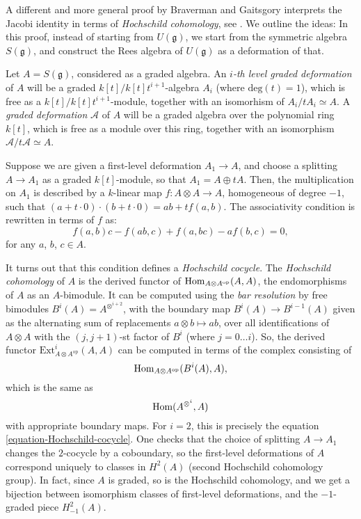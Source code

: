 \begin{remark}
 \label{remark-PBW-Hochschild}
A different and more general proof by Braverman and Gaitsgory interprets the Jacobi identity in terms of \emph{Hochschild cohomology}, see \cite{Braverman-Gaitsgory-PBW}. We outline the ideas: In this proof, instead of starting from $U(\mathfrak g)$, we start from the symmetric algebra $S(\mathfrak g)$, and construct the Rees algebra of $U(\mathfrak g)$ as a deformation of that. 

Let $A=S(\mathfrak g)$, considered as a graded algebra. An \emph{$i$-th level graded deformation} of $A$ will be a graded $k[t]/k[t]t^{i+1}$-algebra $A_i$ (where $\text{deg}(t)=1$), which is free as a $k[t]/k[t]t^{i+1}$-module, together with an isomorhism of $A_i/tA_i \simeq A$. A \emph{graded deformation} $\mathcal A$ of $A$ will be a graded algebra over the
polynomial ring $k[t]$, which is free as a module over this ring,
together with an isomorphism $\mathcal A/t\mathcal A\simeq A$.

Suppose we are given a first-level deformation $A_1 \to A $, and choose a splitting $A\to A_1$ as a graded $k[t]$-module, so that $A_1 = A \oplus t A$. Then, the multiplication on $A_1$ is described by a $k$-linear map $f: A\otimes A \to A$, homogeneous of degree $-1$, such that $(a+t \cdot 0)\cdot (b+t\cdot 0) = ab + t f(a,b)$. The associativity condition is rewritten in terms of $f$ as:
\begin{equation}
 \label{equation-Hochschild-cocycle}
f (a, b)c − f (ab, c) + f (a, bc) − af (b, c) = 0, 
\end{equation}
for any $a$, $b$, $c \in A$.

It turns out that this condition defines a \emph{Hochschild cocycle}. The \emph{Hochschild cohomology} of $A$ is the derived functor of $\mathop{\rm Hom}\nolimits_{A\otimes A^{\text{op}}} (A,A)$, the endomorphisms of $A$ as an $A$-bimodule. It can be computed using the \emph{bar resolution} by free bimodules $B^i (A) = A^{\otimes^{i+2}}$, with the boundary map $B^i (A) \to B^{i-1}(A)$ given as the alternating sum of replacements $a\otimes b \mapsto ab$, over all identifications of $A\otimes A$ with the $(j, j+1)$-st factor of $B^i$ (where $j=0\dots i$). So, the derived functor $\text{Ext}^i_{A\otimes A^{\text{op}}} (A,A)$ can be computed in terms of the complex consisting of 
$$ \mathop{\rm Hom}\nolimits_{A\otimes A^{\text{op}}} (B^i(A),A),$$
which is the same as 
$$\mathop{\rm Hom}\nolimits (A^{\otimes^i},A)$$
with appropriate boundary maps. For $i=2$, this is precisely the equation \eqref{equation-Hochschild-cocycle}. One checks that the choice of splitting $A\to A_1$ changes the $2$-cocycle by a coboundary, so the first-level deformations of $A$ correspond uniquely to classes in $H^2(A)$ (second Hochschild cohomology group). In fact, since $A$ is graded, so is the Hochschild cohomology, and we get a bijection between isomorphism classes of first-level deformations, and the $-1$-graded piece $H^2_{-1}(A)$. 


\end{remark}
